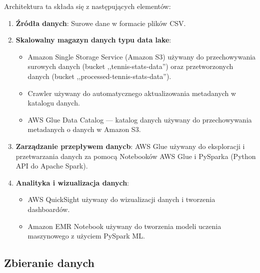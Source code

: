 \documentclass[12pt, a4paper]{article}
\begin{document}
Architektura ta składa się z następujących elementów:
\begin{enumerate}
    \item \textbf{Źródła danych}: Surowe dane w formacie plików CSV.
    \item \textbf{Skalowalny magazyn danych typu data lake}: 
    \begin{itemize}
        \item Amazon Single Storage Service (Amazon S3) używany do przechowywania surowych danych (bucket ,,tennis-stats-data'') oraz przetworzonych danych (bucket ,,processed-tennis-stats-data'').
        \item Crawler używany do automatycznego aktualizowania metadanych w katalogu danych.
        \item AWS Glue Data Catalog --- katalog danych używany do przechowywania metadanych o danych w Amazon S3.
    \end{itemize}
    \item \textbf{Zarządzanie przepływem danycb}: AWS Glue używany do eksploracji i przetwarzania danych za pomocą Notebooków AWS Glue i PySparka (Python API do Apache Spark).
    \item \textbf{Analityka i wizualizacja danych}: \begin{itemize}
        \item AWS QuickSight używany do wizualizacji danych i tworzenia dashboardów.
        \item Amazon EMR Notebook używany do tworzenia modeli uczenia maszynowego z użyciem PySpark ML.
    \end{itemize}


\end{enumerate}


\subsection{Zbieranie danych}
\end{document}
